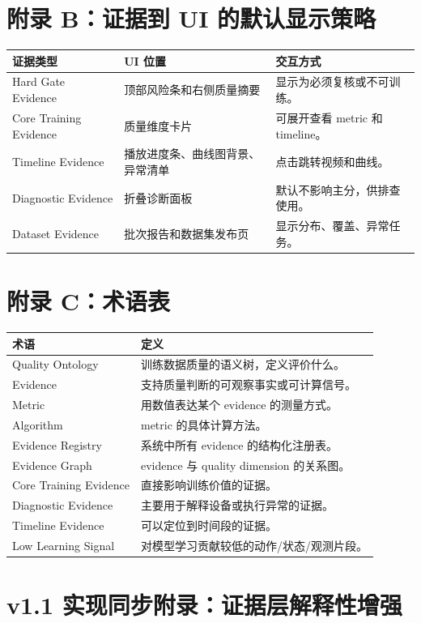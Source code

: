 \documentclass[UTF8,zihao=-4]{ctexart}
\begin{document}
\section{附录 B：证据到 UI 的默认显示策略}

\begin{longtable}{L{3.5cm} L{4.5cm} L{5.5cm}}
\toprule
证据类型 & UI 位置 & 交互方式 \\
\midrule
Hard Gate Evidence & 顶部风险条和右侧质量摘要 & 显示为必须复核或不可训练。 \\
Core Training Evidence & 质量维度卡片 & 可展开查看 metric 和 timeline。 \\
Timeline Evidence & 播放进度条、曲线图背景、异常清单 & 点击跳转视频和曲线。 \\
Diagnostic Evidence & 折叠诊断面板 & 默认不影响主分，供排查使用。 \\
Dataset Evidence & 批次报告和数据集发布页 & 显示分布、覆盖、异常任务。 \\
\bottomrule
\end{longtable}

\section{附录 C：术语表}

\begin{longtable}{L{3.2cm} L{10.5cm}}
\toprule
术语 & 定义 \\
\midrule
Quality Ontology & 训练数据质量的语义树，定义评价什么。 \\
Evidence & 支持质量判断的可观察事实或可计算信号。 \\
Metric & 用数值表达某个 evidence 的测量方式。 \\
Algorithm & metric 的具体计算方法。 \\
Evidence Registry & 系统中所有 evidence 的结构化注册表。 \\
Evidence Graph & evidence 与 quality dimension 的关系图。 \\
Core Training Evidence & 直接影响训练价值的证据。 \\
Diagnostic Evidence & 主要用于解释设备或执行异常的证据。 \\
Timeline Evidence & 可以定位到时间段的证据。 \\
Low Learning Signal & 对模型学习贡献较低的动作/状态/观测片段。 \\
\bottomrule
\end{longtable}


\newpage
\section*{v1.1 实现同步附录：证据层解释性增强}
\end{document}
